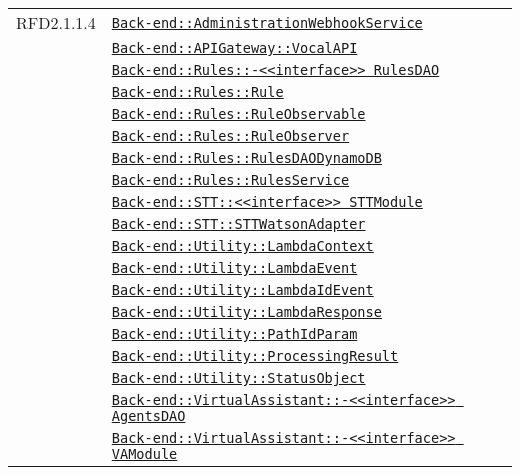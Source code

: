 \begin{longtable}{|>{\centering}m{3cm}|m{10cm}<{\centering}|}
RFD2.1.1.4 & \hyperref[Back-end::AdministrationWebhookService]{\texttt{Back-end::AdministrationWebhookService}}\\
& \hyperref[Back-end::APIGateway::VocalAPI]{\texttt{Back-end::APIGateway::VocalAPI}}\\
& \hyperref[Back-end::Rules::<<interface>> RulesDAO]{\texttt{Back-end::Rules::-\linebreak <<interface>> RulesDAO}}\\
& \hyperref[Back-end::Rules::Rule]{\texttt{Back-end::Rules::Rule}}\\
& \hyperref[Back-end::Rules::RuleObservable]{\texttt{Back-end::Rules::RuleObservable}}\\
& \hyperref[Back-end::Rules::RuleObserver]{\texttt{Back-end::Rules::RuleObserver}}\\
& \hyperref[Back-end::Rules::RulesDAODynamoDB]{\texttt{Back-end::Rules::RulesDAODynamoDB}}\\
& \hyperref[Back-end::Rules::RulesService]{\texttt{Back-end::Rules::RulesService}}\\
& \hyperref[Back-end::STT::<<interface>> STTModule]{\texttt{Back-end::STT::<<interface>> STTModule}}\\
& \hyperref[Back-end::STT::STTWatsonAdapter]{\texttt{Back-end::STT::STTWatsonAdapter}}\\
& \hyperref[Back-end::Utility::LambdaContext]{\texttt{Back-end::Utility::LambdaContext}}\\
& \hyperref[Back-end::Utility::LambdaEvent]{\texttt{Back-end::Utility::LambdaEvent}}\\
& \hyperref[Back-end::Utility::LambdaIdEvent]{\texttt{Back-end::Utility::LambdaIdEvent}}\\
& \hyperref[Back-end::Utility::LambdaResponse]{\texttt{Back-end::Utility::LambdaResponse}}\\
& \hyperref[Back-end::Utility::PathIdParam]{\texttt{Back-end::Utility::PathIdParam}}\\
& \hyperref[Back-end::Utility::ProcessingResult]{\texttt{Back-end::Utility::ProcessingResult}}\\
& \hyperref[Back-end::Utility::StatusObject]{\texttt{Back-end::Utility::StatusObject}}\\
& \hyperref[Back-end::VirtualAssistant::<<interface>> AgentsDAO]{\texttt{Back-end::VirtualAssistant::-\linebreak <<interface>> AgentsDAO}}\\
& \hyperref[Back-end::VirtualAssistant::<<interface>> VAModule]{\texttt{Back-end::VirtualAssistant::-\linebreak <<interface>> VAModule}}\\

\end{longtable}
